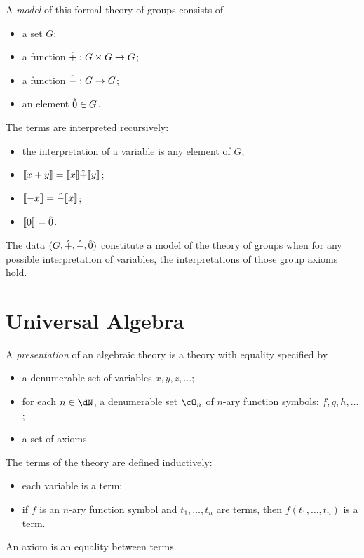 \documentclass{amsart}
\begin{document}
\begin{defn}
  A \emph{model} of this formal theory of groups consists of
  \begin{itemize}
  \item a set $G$;
  \item a function $\hat{+} : G \times G \to G$;
  \item a function $\hat{-} : G \to G$;
  \item an element $\hat{0} \in G$.
  \end{itemize}
  The terms are interpreted recursively:
  \begin{itemize}
  \item the interpretation of a variable is any element of $G$;
  \item $\llbracket x + y \rrbracket = \llbracket x \rrbracket \hat{+} \llbracket y \rrbracket$;
  \item $\llbracket -x \rrbracket = \hat{-} \llbracket x \rrbracket$;
  \item $\llbracket 0 \rrbracket = \hat{0}$.
  \end{itemize}
\end{defn}

The data $(G,\hat{+},\hat{-},\hat{0})$ constitute a model of the theory of groups when for any possible interpretation of variables, the interpretations of those group axioms hold.

\section{Universal Algebra}
\label{sec:universal-algebra}

\begin{defn}
  A \emph{presentation} of an algebraic theory is a theory with equality specified by
  \begin{itemize}
  \item a denumerable set of variables $x, y, z, \ldots$;
  \item for each $n \in \dN$, a denumerable set $\cO_{n}$ of $n$-ary function symbols: $f, g, h,\ldots$;
  \item a set of axioms
  \end{itemize}
  The terms of the theory are defined inductively:
  \begin{itemize}
  \item each variable is a term;
  \item if $f$ is an $n$-ary function symbol and $t_{1},\ldots,t_{n}$ are terms, then $f(t_{1},\ldots,t_{n})$ is a term.
  \end{itemize}
  An axiom is an equality between terms.
\end{defn}
\end{document}
